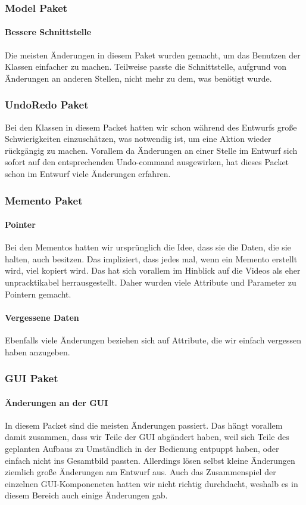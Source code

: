 \documentclass{scrartcl}
\begin{document}
{\subsubsection{Model Paket}
\paragraph{Bessere Schnittstelle} Die meisten Änderungen in diesem Paket wurden gemacht, um das Benutzen der Klassen einfacher zu machen. Teilweise passte die Schnittstelle, aufgrund von Änderungen an anderen Stellen, nicht mehr zu dem, was benötigt wurde. 
\bigskip
\subsubsection{UndoRedo Paket}
Bei den Klassen in diesem Packet hatten wir schon während des Entwurfs große Schwierigkeiten einzuschätzen, was notwendig ist, um eine Aktion wieder rückgängig zu machen. Vorallem da Änderungen an einer Stelle im Entwurf sich sofort auf den entsprechenden Undo-command ausgewirken, hat dieses Packet schon im Entwurf viele Änderungen erfahren.
\bigskip
\subsubsection{Memento Paket}
\paragraph{Pointer} Bei den Mementos hatten wir ursprünglich die Idee, dass sie die Daten, die sie halten, auch besitzen. Das impliziert, dass jedes mal, wenn ein Memento erstellt wird, viel kopiert wird. Das hat sich vorallem im Hinblick auf die Videos als eher unpracktikabel herrausgestellt. Daher wurden viele Attribute und Parameter zu Pointern gemacht.
\paragraph{Vergessene Daten} Ebenfalls viele Änderungen beziehen sich auf Attribute, die wir einfach vergessen haben anzugeben.
\bigskip
\subsubsection{GUI Paket}
\paragraph{Änderungen an der GUI} In diesem Packet sind die meisten Änderungen passiert. Das hängt vorallem damit zusammen, dass wir Teile der GUI abgändert haben, weil sich Teile des geplanten Aufbaus zu Umständlich in der Bedienung entpuppt haben, oder einfach nicht ins Gesamtbild passten. Allerdings lösen selbst kleine Änderungen ziemlich große Änderungen am Entwurf aus. Auch das Zusammenspiel der einzelnen GUI-Komponeneten hatten wir nicht richtig durchdacht, weshalb es in diesem Bereich auch einige Änderungen gab.
\newpage
}
\end{document}

